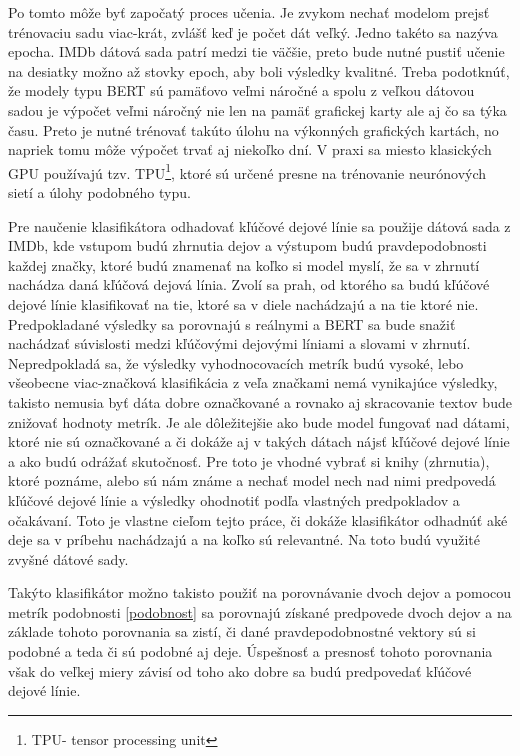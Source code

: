 Po tomto môže byť započatý proces učenia. Je zvykom nechať modelom prejsť trénovaciu sadu viac-krát, zvlášť keď je počet dát veľký. Jedno takéto  sa nazýva epocha. IMDb dátová sada patrí medzi tie väčšie, preto bude nutné pustiť učenie na desiatky možno až stovky epoch, aby boli výsledky kvalitné. Treba podotknúť, že modely typu BERT sú pamäťovo veľmi náročné a spolu z veľkou dátovou sadou je výpočet veľmi náročný nie len na pamäť grafickej karty ale aj čo sa týka času. Preto je nutné trénovať takúto úlohu na výkonných grafických kartách, no napriek tomu môže výpočet trvať aj niekoľko dní. V praxi sa miesto klasických GPU používajú tzv. TPU\footnote{TPU- tensor processing unit}, ktoré sú určené presne na trénovanie neurónových sietí a úlohy podobného typu. 

Pre naučenie klasifikátora odhadovať kľúčové dejové línie sa použije dátová sada z IMDb, kde vstupom budú zhrnutia dejov a výstupom budú pravdepodobnosti každej značky, ktoré budú znamenať na koľko si model myslí, že sa v zhrnutí nachádza daná kľúčová dejová línia. Zvolí sa prah, od ktorého sa budú kľúčové dejové línie klasifikovať na tie, ktoré sa v diele nachádzajú a na tie ktoré nie. Predpokladané výsledky sa porovnajú s reálnymi a BERT sa bude snažiť nachádzať súvislosti medzi kľúčovými dejovými líniami a slovami v zhrnutí. Nepredpokladá sa, že výsledky vyhodnocovacích metrík budú vysoké, lebo všeobecne viac-značková klasifikácia z veľa značkami nemá vynikajúce výsledky, takisto nemusia byť dáta dobre označkované a rovnako aj skracovanie textov bude znižovať hodnoty metrík. Je ale dôležitejšie ako bude model fungovať nad dátami, ktoré nie sú označkované a či dokáže aj v takých dátach nájsť kľúčové dejové línie a ako budú odrážať skutočnosť. Pre toto je vhodné vybrať si knihy (zhrnutia), ktoré poznáme, alebo sú nám známe a nechať model nech nad nimi predpovedá kľúčové dejové línie a výsledky ohodnotiť podľa vlastných predpokladov a očakávaní. Toto je vlastne cieľom tejto práce, či dokáže klasifikátor odhadnúť aké deje sa v príbehu nachádzajú a na koľko sú relevantné. Na toto budú využité zvyšné dátové sady.

Takýto klasifikátor možno takisto použiť na porovnávanie dvoch dejov a pomocou metrík podobnosti \ref{podobnost} sa porovnajú získané predpovede dvoch dejov a na základe tohoto porovnania sa zistí, či dané pravdepodobnostné vektory sú si podobné a teda či sú podobné aj deje. Úspešnosť a presnosť tohoto porovnania však do veľkej miery závisí od toho ako dobre sa budú predpovedať kľúčové dejové línie.

